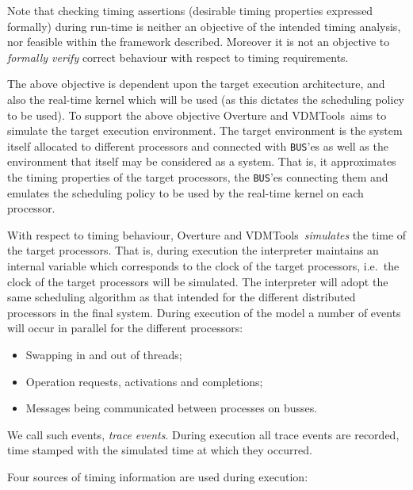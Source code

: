 \documentclass{overturerepchap}
\newcommand{\vdmtools}{VDMTools}
\begin{document}
Note that checking timing assertions (desirable timing properties expressed
formally) during run-time is neither an
objective of the intended timing analysis, nor feasible within the
framework described. Moreover it is not an objective to \emph{formally
verify} correct behaviour with respect to timing requirements.

The above objective is dependent upon the target execution
architecture, and also the real-time kernel which will be used (as
this dictates the scheduling policy to be used).  To support the above
objective Overture and \vdmtools\ aims to simulate the target execution
environment. The target environment is the system itself allocated to
different processors and connected with \texttt{BUS}'es as well as the
environment that itself may be considered as a system. That is, it
approximates the timing properties of the target processors, the
\texttt{BUS}'es connecting them and emulates the scheduling policy to be used
by the real-time kernel on each processor.

With respect to timing behaviour, Overture and \vdmtools\ \emph{simulates}
the time of the target processors. That is, during execution the
interpreter maintains an internal variable which corresponds
to the clock of the target processors, i.e.\ the clock of the target
processors will be simulated. The interpreter will adopt the same
scheduling algorithm as that intended for the different distributed
processors in the final system. During execution of the model a number
of events will occur in parallel for the different processors:

\begin{itemize}
\item Swapping in and out of threads;
\item Operation requests, activations and completions;
\item Messages being communicated between processes on busses.
\end{itemize}

We call such events, \emph{trace events}. During execution all trace
events are recorded, time stamped with the simulated time at which
they occurred.

Four sources of timing information are used during execution:
\end{document}
